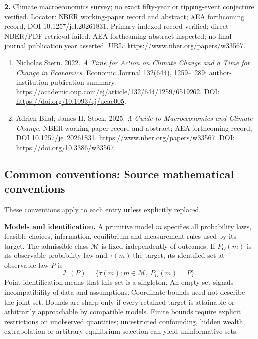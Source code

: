 \documentclass[11pt,a4paper]{article}
\begin{document}
\textbf{2.} Climate macroeconomics survey; no exact fifty-year or tipping-event conjecture verified. Locator: NBER working-paper record and abstract; AEA forthcoming record, DOI 10.1257/jel.20261831. Primary indexed record verified; direct NBER/PDF retrieval failed. AEA forthcoming abstract inspected; no final journal publication year asserted. URL: \url{https://www.nber.org/papers/w33567}.
\begin{enumerate}\raggedright
\item\hypertarget{definitions:source:30007721:1}{} Nicholas Stern. 2022. \emph{A Time for Action on Climate Change and a Time for Change in Economics}. Economic Journal 132(644), 1259–1289; author-institution publication summary.
\url{https://academic.oup.com/ej/article/132/644/1259/6519262}.
DOI: \url{https://doi.org/10.1093/ej/ueac005}.
\item\hypertarget{definitions:source:30007721:2}{} Adrien Bilal; James H. Stock. 2025. \emph{A Guide to Macroeconomics and Climate Change}. NBER working-paper record and abstract; AEA forthcoming record, DOI 10.1257/jel.20261831.
\url{https://www.nber.org/papers/w33567}.
DOI: \url{https://doi.org/10.3386/w33567}.
\end{enumerate}

\subsection*{Common conventions: Source mathematical conventions}

These conventions apply to each entry unless explicitly replaced.

\textbf{Models and identification.} A primitive model \(m\) specifies all probability laws, feasible choices, information, equilibrium and measurement rules used by its target. The admissible class \(\mathcal M\) is fixed independently of outcomes. If \(P_O(m)\) is its observable probability law and \(\tau(m)\) the target, its identified set at observable law \(P\) is
\[
 \mathcal I_\tau(P)=\{\tau(m):m\in\mathcal M,\ P_O(m)=P\}.
\]
Point identification means that this set is a singleton. An empty set signals incompatibility of data and assumptions. Coordinate bounds need not describe the joint set. Bounds are sharp only if every retained target is attainable or arbitrarily approachable by compatible models. Finite bounds require explicit restrictions on unobserved quantities; unrestricted confounding, hidden wealth, extrapolation or arbitrary equilibrium selection can yield uninformative sets.
\end{document}
